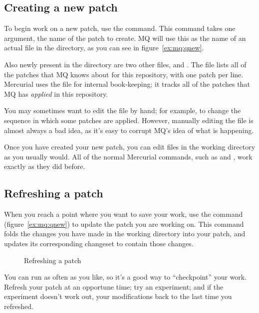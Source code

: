 \subsection{Creating a new patch}

To begin work on a new patch, use the  command.  This
command takes one argument, the name of the patch to create.  MQ will
use this as the name of an actual file in the 
directory, as you can see in figure~\ref{ex:mq:qnew}.

Also newly present in the  directory are two
other files,  and .  The
 file lists all of the patches that MQ knows about
for this repository, with one patch per line.  Mercurial uses the
 file for internal book-keeping; it tracks all of the
patches that MQ has \emph{applied} in this repository.

\begin{note}
  You may sometimes want to edit the  file by hand;
  for example, to change the sequence in which some patches are
  applied.  However, manually editing the  file is
  almost always a bad idea, as it's easy to corrupt MQ's idea of what
  is happening.
\end{note}

Once you have created your new patch, you can edit files in the
working directory as you usually would.  All of the normal Mercurial
commands, such as  and , work exactly as
they did before.

\subsection{Refreshing a patch}

When you reach a point where you want to save your work, use the
 command (figure~\ref{ex:mq:qnew}) to update the patch
you are working on.  This command folds the changes you have made in
the working directory into your patch, and updates its corresponding
changeset to contain those changes.

\begin{figure}[ht]
  \caption{Refreshing a patch}
  \label{ex:mq:qrefresh}
\end{figure}

You can run  as often as you like, so it's a good way
to ``checkpoint'' your work.  Refresh your patch at an opportune
time; try an experiment; and if the experiment doesn't work out,
 your modifications back to the last time you refreshed.

